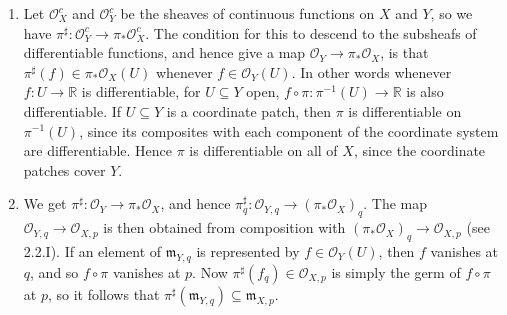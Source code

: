 \documentclass{report}
\newcommand{\m}{\mathfrak{m}}
\renewcommand{\O}{\mathscr{O}} %
\newcommand{\R}{\mathbb{R}}
\begin{document}
\begin{enumerate}[label=\textbf{3.1.\Alph*.}]
	\item Let $\O^c_X$ and $\O^c_Y$ be the sheaves of continuous functions on
	      $X$ and $Y$, so we have $\pi^\sharp:\O^c_Y\to\pi_*\O^c_X$. The condition
	      for this to descend to the subsheafs of differentiable functions, and
	      hence give a map $\O_Y\to\pi_*\O_X$, is that
	      $\pi^\sharp(f)\in\pi_*\O_X(U)$ whenever $f\in\O_Y(U)$. In other words
	      whenever $f:U\to\R$ is differentiable, for $U\subseteq Y$ open,
	      $f\circ\pi:\pi^{-1}(U)\to\R$ is also differentiable. If $U\subseteq Y$
	      is a coordinate patch, then $\pi$ is differentiable on $\pi^{-1}(U)$,
	      since its composites with each component of the coordinate system are
	      differentiable. Hence $\pi$ is differentiable on all of $X$, since the
	      coordinate patches cover $Y$.

	\item We get $\pi^\sharp:\O_Y\to\pi_*\O_X$, and hence
	      $\pi^\sharp_q:\O_{Y,q}\to(\pi_*\O_X)_q$. The map $\O_{Y,q}\to\O_{X,p}$
	      is then obtained from composition with $(\pi_*\O_X)_q\to\O_{X,p}$ (see
	      2.2.I). If an element of $\m_{Y,q}$ is represented by $f\in\O_Y(U)$,
	      then $f$ vanishes at $q$, and so $f\circ\pi$ vanishes at $p$. Now
	      $\pi^\sharp(f_q)\in\O_{X,p}$ is simply the germ of $f\circ\pi$ at $p$,
	      so it follows that $\pi^\sharp(\m_{Y,q})\subseteq\m_{X,p}$.
\end{enumerate}
\end{document}
